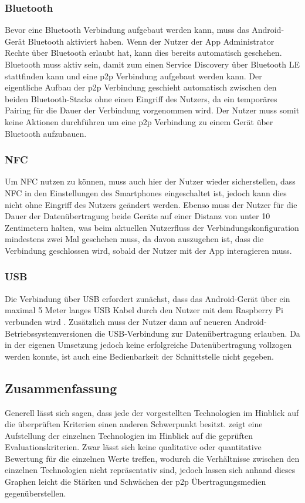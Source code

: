 		\subsubsection{Bluetooth} Bevor eine Bluetooth Verbindung aufgebaut werden kann, muss das Android-Gerät Bluetooth aktiviert haben. Wenn der Nutzer der App Administrator Rechte über Bluetooth erlaubt hat, kann dies bereits automatisch geschehen. Bluetooth muss aktiv sein, damit zum einen Service Discovery über Bluetooth LE stattfinden kann und eine p2p Verbindung aufgebaut werden kann. Der eigentliche Aufbau der p2p Verbindung geschieht automatisch zwischen den beiden Bluetooth-Stacks ohne einen Eingriff des Nutzers, da  ein temporäres Pairing für die Dauer der Verbindung vorgenommen wird. Der Nutzer muss somit keine Aktionen durchführen um eine p2p Verbindung zu einem Gerät über Bluetooth aufzubauen.
		
		\subsubsection{NFC} Um NFC nutzen zu können, muss auch hier der Nutzer wieder sicherstellen, dass NFC in den Einstellungen des Smartphones eingeschaltet ist, jedoch kann dies nicht ohne Eingriff des Nutzers geändert werden. Ebenso muss der Nutzer für die Dauer der Datenübertragung beide Geräte auf einer Distanz von unter 10 Zentimetern halten, was beim aktuellen Nutzerfluss der Verbindungskonfiguration mindestens zwei Mal geschehen muss, da davon auszugehen ist, dass die Verbindung geschlossen wird, sobald der Nutzer mit der App interagieren muss.
		
           \subsubsection{USB} Die Verbindung über USB erfordert zunächst, dass das Android-Gerät über ein maximal 5 Meter langes USB Kabel durch den Nutzer mit dem Raspberry Pi verbunden wird \cite[S.22]{Kelm}. Zusätzlich muss der Nutzer dann auf neueren Android-Betriebssystemversionen die USB-Verbindung zur Datenübertragung erlauben. Da in der eigenen Umsetzung jedoch keine erfolgreiche Datenübertragung vollzogen werden konnte, ist auch eine Bedienbarkeit der Schnittstelle nicht gegeben.
		
		\subsection{Zusammenfassung}
		Generell lässt sich sagen, dass jede der vorgestellten Technologien im Hinblick auf die überprüften Kriterien einen anderen Schwerpunkt besitzt.  zeigt eine Aufstellung der einzelnen Technologien im Hinblick auf die geprüften Evaluationskriterien. Zwar lässt sich keine qualitative oder quantitative Bewertung für die einzelnen Werte treffen, wodurch die Verhältnisse zwischen den einzelnen Technologien nicht repräsentativ sind, jedoch lassen sich anhand dieses Graphen leicht die Stärken und Schwächen der p2p Übertragungsmedien gegenüberstellen.
		
